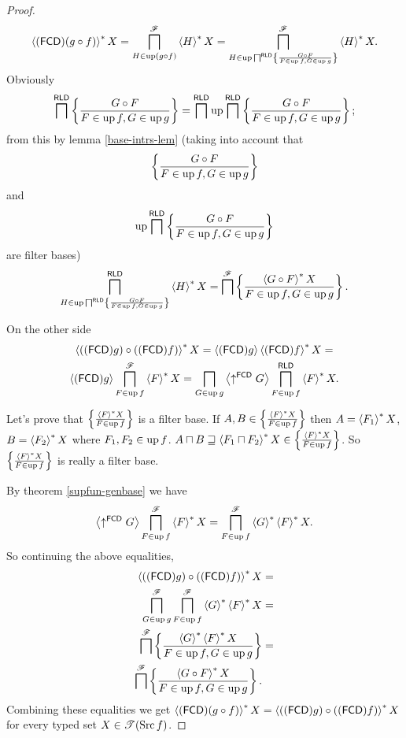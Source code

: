\begin{proof}
~
\[
\rsupfun{\tofcd(g\circ f)}X=\bigsqcap_{H\in\up(g\circ f)}^{\mathscr{F}}\rsupfun HX=\bigsqcap_{H\in\up\bigsqcap^{\mathsf{RLD}}\setcond{G\circ F}{F\in\up f,G\in\up g}}^{\mathscr{F}}\rsupfun HX.
\]
Obviously
\[
\bigsqcap^{\mathsf{RLD}}\setcond{G\circ F}{F\in\up f,G\in\up g}=\bigsqcap^{\mathsf{RLD}}\up\bigsqcap^{\mathsf{RLD}}\setcond{G\circ F}{F\in\up f,G\in\up g};
\]
from this by lemma \ref{base-intrs-lem} (taking into account that
\[
\setcond{G\circ F}{F\in\up f,G\in\up g}
\]
and
\[
\up\bigsqcap^{\mathsf{RLD}}\setcond{G\circ F}{F\in\up f,G\in\up g}
\]
are filter bases)
\[
\bigsqcap_{H\in\up\bigsqcap^{\mathsf{RLD}}\setcond{G\circ F}{F\in\up f,G\in\up g}}^{\mathsf{RLD}}\rsupfun HX=\bigsqcap^{\mathscr{F}}\setcond{\rsupfun{G\circ F}X}{F\in\up f,G\in\up g}.
\]


On the other side
\begin{multline*}
\rsupfun{(\tofcd g)\circ(\tofcd f)}X=\supfun{\tofcd g}\rsupfun{\tofcd f}X=\\
\supfun{\tofcd g}\bigsqcap_{F\in\up f}^{\mathscr{F}}\rsupfun FX=\bigsqcap_{G\in\up g}\supfun{\uparrow^{\mathsf{FCD}}G}\bigsqcap_{F\in\up f}^{\mathsf{RLD}}\rsupfun FX.
\end{multline*}


Let's prove that $\setcond{\rsupfun FX}{F\in\up f}$ is a filter base.
If $A,B\in\setcond{\rsupfun FX}{F\in\up f}$ then $A=\rsupfun{F_{1}}X$,
$B=\rsupfun{F_{2}}X$ where $F_{1},F_{2}\in\up f$. $A\sqcap B\sqsupseteq\rsupfun{F_{1}\sqcap F_{2}}X\in\setcond{\rsupfun FX}{F\in\up f}$.
So $\setcond{\rsupfun FX}{F\in\up f}$ is really a filter base.

By theorem \ref{supfun-genbase} we have
\[
\supfun{\uparrow^{\mathsf{FCD}}G}\bigsqcap_{F\in\up f}^{\mathscr{F}}\rsupfun FX=\bigsqcap_{F\in\up f}^{\mathscr{F}}\rsupfun G\rsupfun FX.
\]
So continuing the above equalities,
\begin{align*}
\rsupfun{(\tofcd g)\circ(\tofcd f)}X & =\\
\bigsqcap_{G\in\up g}^{\mathscr{F}}\bigsqcap_{F\in\up f}^{\mathscr{F}}\rsupfun G\rsupfun FX & =\\
\bigsqcap^{\mathscr{F}}\setcond{\rsupfun G\rsupfun FX}{F\in\up f,G\in\up g} & =\\
\bigsqcap^{\mathscr{F}}\setcond{\rsupfun{G\circ F}X}{F\in\up f,G\in\up g}.
\end{align*}
Combining these equalities we get $\rsupfun{\tofcd(g\circ f)}X=\rsupfun{(\tofcd g)\circ(\tofcd f)}X$
for every typed set $X\in\mathscr{T}(\Src f)$.\end{proof}
